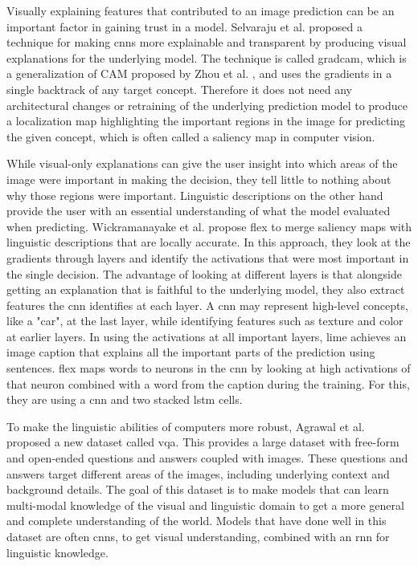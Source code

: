 Visually explaining features that contributed to an image prediction can be an important factor in gaining trust in a model. Selvaraju et al. \cite{selvarajuGradCAMVisualExplanations2020} proposed a technique for making \glspl{cnn} more explainable and transparent by producing visual explanations for the underlying model. The technique is called \gls{gradcam}, which is a generalization of CAM proposed by Zhou et al. \cite{zhouLearningDeepFeatures2016}, and uses the gradients in a single backtrack of any target concept. Therefore it does not need any architectural changes or retraining of the underlying prediction model to produce a localization map highlighting the important regions in the image for predicting the given concept, which is often called a saliency map in computer vision.



While visual-only explanations can give the user insight into which areas of the image were important in making the decision, they tell little to nothing about why those regions were important. Linguistic descriptions on the other hand provide the user with an essential understanding of what the model evaluated when predicting. 
Wickramanayake et al. \cite{wickramanayakeFLEXFaithfulLinguistic2019} propose \gls{flex} to merge saliency maps with linguistic descriptions that are locally accurate. In this approach, they look at the gradients through layers and identify the activations that were most important in the single decision. The advantage of looking at different layers is that alongside getting an explanation that is faithful to the underlying model, they also extract features the \gls{cnn} identifies at each layer. A \gls{cnn} may represent high-level concepts, like a "car", at the last layer, while identifying features such as texture and color at earlier layers. In using the activations at all important layers, \gls{lime} achieves an image caption that explains all the important parts of the prediction using sentences. \gls{flex} maps words to neurons in the \gls{cnn} by looking at high activations of that neuron combined with a word from the caption during the training. For this, they are using a \gls{cnn} and two stacked \gls{lstm} \cite{hochreiterLongShorttermMemory1997} cells. %

To make the linguistic abilities of computers more robust, Agrawal et al. \cite{agrawalVQAVisualQuestion2016} proposed a new dataset called \gls{vqa}. This provides a large dataset with free-form and open-ended questions and answers coupled with images. These questions and answers target different areas of the images, including underlying context and background details. The goal of this dataset is to make models that can learn multi-modal knowledge of the visual and linguistic domain to get a more general and complete understanding of the world. Models that have done well in this dataset are often \glspl{cnn}, to get visual understanding, combined with an \gls{rnn} %
for linguistic knowledge.

